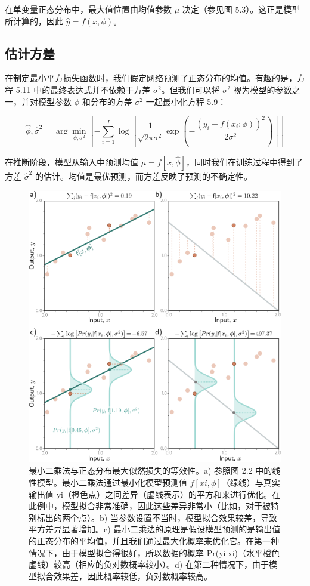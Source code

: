 在单变量正态分布中，最大值位置由均值参数 \(\mu\) 决定（参见图 5.3）。这正是模型所计算的，因此 \(\hat{y} = f(x, \phi)\)。
\subsection{估计方差}

在制定最小平方损失函数时，我们假定网络预测了正态分布的均值。有趣的是，方程 5.11 中的最终表达式并不依赖于方差 \(\sigma^2\)。但我们可以将 \(\sigma^2\) 视为模型的参数之一，并对模型参数 \(\phi\) 和分布的方差 \(\sigma^2\) 一起最小化方程 5.9：


\begin{equation}
\hat{\phi}, \hat{\sigma}^2 = \arg\min_{\phi,\sigma^2} \left[ -\sum_{i=1}^I \log \left[ \frac{1}{\sqrt{2\pi\sigma^2}} \exp \left( -\frac{(y_i - f(x_i; \phi))^2}{2\sigma^2} \right) \right] \right] 
\end{equation}


在推断阶段，模型从输入中预测均值 \(\mu = f[x, \hat{\phi}]\)，同时我们在训练过程中得到了方差 \(\hat{\sigma}^2\) 的估计。均值是最优预测，而方差反映了预测的不确定性。

\begin{figure}[ht!]
	\centering
	\includegraphics[width=0.7\linewidth]{png/chapter5/LossNormalRegression.png}
	\caption{最小二乘法与正态分布最大似然损失的等效性。a) 参照图 2.2 中的线性模型。最小二乘法通过最小化模型预测值 \(f[xi,\phi]\)（绿线）与真实输出值 yi（橙色点）之间差异（虚线表示）的平方和来进行优化。在此例中，模型拟合非常准确，因此这些差异非常小（比如，对于被特别标出的两个点）。b) 当参数设置不当时，模型拟合效果较差，导致平方差异显著增加。c) 最小二乘法的原理是假设模型预测的是输出值的正态分布的平均值，并且我们通过最大化概率来优化它。在第一种情况下，由于模型拟合得很好，所以数据的概率 Pr(yi|xi)（水平橙色虚线）较高（相应的负对数概率较小）。d) 在第二种情况下，由于模型拟合效果差，因此概率较低，负对数概率较高。}
\end{figure}


